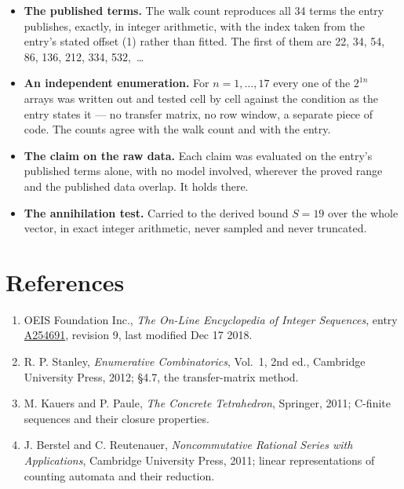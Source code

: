 \documentclass[11pt]{article}
\theoremstyle{definition}
\begin{document}
\begin{itemize}

\item {\bfseries The published terms.} The walk count reproduces all 34 terms the entry publishes, exactly, in integer arithmetic, with the index taken from the entry's stated offset (1) rather than fitted. The first of them are 22, 34, 54, 86, 136, 212, 334, 532,~\dots

\item {\bfseries An independent enumeration.} For $n = 1,\dots,17$ every one of the $2^{1n}$ arrays was written out and tested cell by cell against the condition as the entry states it --- no transfer matrix, no row window, a separate piece of code. The counts agree with the walk count and with the entry.

\item {\bfseries The claim on the raw data.} Each claim was evaluated on the entry's published terms alone, with no model involved, wherever the proved range and the published data overlap. It holds there.

\item {\bfseries The annihilation test.} Carried to the derived bound $S = 19$ over the whole vector, in exact integer arithmetic, never sampled and never truncated.

\end{itemize}

\section{References}

\begin{enumerate}

\item OEIS Foundation Inc., \emph{The On-Line Encyclopedia of Integer Sequences}, entry \href{https://oeis.org/A254691}{A254691}, revision 9, last modified Dec 17 2018.

\item R. P. Stanley, \emph{Enumerative Combinatorics}, Vol.~1, 2nd ed., Cambridge University Press, 2012; \S4.7, the transfer-matrix method.

\item M. Kauers and P. Paule, \emph{The Concrete Tetrahedron}, Springer, 2011; C-finite sequences and their closure properties.

\item J. Berstel and C. Reutenauer, \emph{Noncommutative Rational Series with Applications}, Cambridge University Press, 2011; linear representations of counting automata and their reduction.

\end{enumerate}
\end{document}
